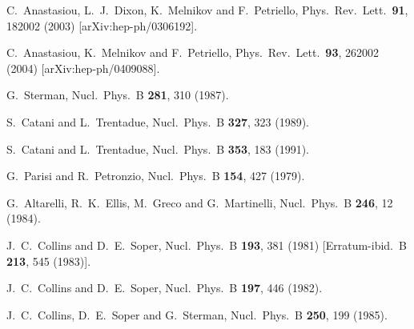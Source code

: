 \documentclass[12pt]{iopart}
\begin{document}
\begin{thebibliography}{99}
  C.~Anastasiou, L.~J.~Dixon, K.~Melnikov and F.~Petriello,
  Phys.\ Rev.\ Lett.\  {\bf 91}, 182002 (2003)
  [arXiv:hep-ph/0306192].
  
  C.~Anastasiou, K.~Melnikov and F.~Petriello,
  Phys.\ Rev.\ Lett.\  {\bf 93}, 262002 (2004)
  [arXiv:hep-ph/0409088].

  G.~Sterman,
  Nucl.\ Phys.\ B {\bf 281}, 310 (1987).

  S.~Catani and L.~Trentadue,
  Nucl.\ Phys.\ B {\bf 327}, 323 (1989).

  S.~Catani and L.~Trentadue,
  Nucl.\ Phys.\ B {\bf 353}, 183 (1991).

  G.~Parisi and R.~Petronzio,
  Nucl.\ Phys.\ B {\bf 154}, 427 (1979).

  G.~Altarelli, R.~K.~Ellis, M.~Greco and G.~Martinelli,
  Nucl.\ Phys.\ B {\bf 246}, 12 (1984).

  J.~C.~Collins and D.~E.~Soper,
  Nucl.\ Phys.\ B {\bf 193}, 381 (1981)
  [Erratum-ibid.\ B {\bf 213}, 545 (1983)].

  J.~C.~Collins and D.~E.~Soper,
  Nucl.\ Phys.\ B {\bf 197}, 446 (1982).

  J.~C.~Collins, D.~E.~Soper and G.~Sterman,
  Nucl.\ Phys.\ B {\bf 250}, 199 (1985).


\end{thebibliography}
\end{document}
